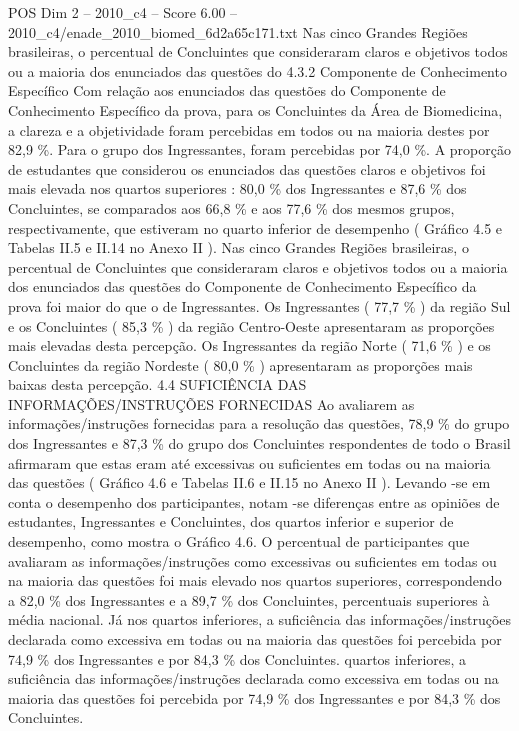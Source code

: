 \begin{textsample}{POS Dim 2 – 2010\_c4 – Score 6.00 – 2010\_c4/enade\_2010\_biomed\_6d2a65c171.txt}
Nas cinco Grandes Regiões brasileiras, o percentual de Concluintes que consideraram claros e objetivos todos ou a maioria dos enunciados das questões do 4.3.2 Componente de Conhecimento Específico Com relação aos enunciados das questões do Componente de Conhecimento Específico da prova, para os Concluintes da Área de Biomedicina, a clareza e a objetividade foram percebidas em todos ou na maioria destes por 82,9 \%.
Para o grupo dos Ingressantes, foram percebidas por 74,0 \%.
A proporção de estudantes que considerou os enunciados das questões claros e objetivos foi mais elevada nos quartos superiores : 80,0 \% dos Ingressantes e 87,6 \% dos Concluintes, se comparados aos 66,8 \% e aos 77,6 \% dos mesmos grupos, respectivamente, que estiveram no quarto inferior de desempenho ( Gráfico 4.5 e Tabelas II.5 e II.14 no Anexo II ).
Nas cinco Grandes Regiões brasileiras, o percentual de Concluintes que consideraram claros e objetivos todos ou a maioria dos enunciados das questões do Componente de Conhecimento Específico da prova foi maior do que o de Ingressantes.
Os Ingressantes ( 77,7 \% ) da região Sul e os Concluintes ( 85,3 \% ) da região Centro-Oeste apresentaram as proporções mais elevadas desta percepção.
Os Ingressantes da região Norte ( 71,6 \% ) e os Concluintes da região Nordeste ( 80,0 \% ) apresentaram as proporções mais baixas desta percepção. 4.4 SUFICIÊNCIA DAS INFORMAÇÕES/INSTRUÇÕES FORNECIDAS Ao avaliarem as informações/instruções fornecidas para a resolução das questões, 78,9 \% do grupo dos Ingressantes e 87,3 \% do grupo dos Concluintes respondentes de todo o Brasil afirmaram que estas eram até excessivas ou suficientes em todas ou na maioria das questões ( Gráfico 4.6 e Tabelas II.6 e II.15 no Anexo II ).
Levando -se em conta o desempenho dos participantes, notam -se diferenças entre as opiniões de estudantes, Ingressantes e Concluintes, dos quartos inferior e superior de desempenho, como mostra o Gráfico 4.6.
O percentual de participantes que avaliaram as informações/instruções como excessivas ou suficientes em todas ou na maioria das questões foi mais elevado nos quartos superiores, correspondendo a 82,0 \% dos Ingressantes e a 89,7 \% dos Concluintes, percentuais superiores à média nacional.
Já nos quartos inferiores, a suficiência das informações/instruções declarada como excessiva em todas ou na maioria das questões foi percebida por 74,9 \% dos Ingressantes e por 84,3 \% dos Concluintes. quartos inferiores, a suficiência das informações/instruções declarada como excessiva em todas ou na maioria das questões foi percebida por 74,9 \% dos Ingressantes e por 84,3 \% dos Concluintes.

\end{textsample}
